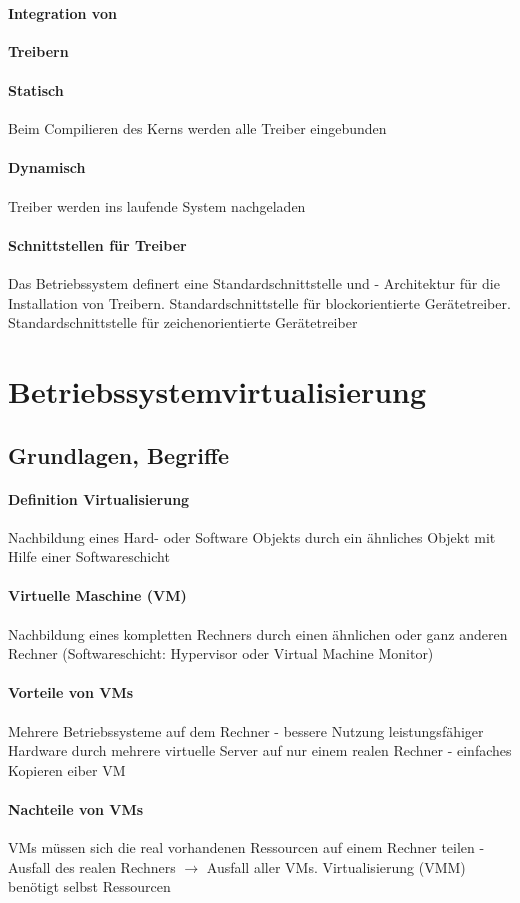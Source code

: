 \documentclass[10pt,a4paper,landscape]{article}
\begin{document}
\begin{multicols*}{3}
	\paragraph{Integration von} \textbf{Treibern}
	\paragraph{Statisch} Beim Compilieren des Kerns werden alle Treiber eingebunden
	\paragraph{Dynamisch} Treiber werden ins laufende System nachgeladen
	\paragraph{Schnittstellen für Treiber} Das Betriebssystem definert eine Standardschnittstelle und - Architektur für die Installation von Treibern. Standardschnittstelle für blockorientierte Gerätetreiber. Standardschnittstelle für zeichenorientierte Gerätetreiber
	\section{Betriebssystemvirtualisierung}
	\subsection{Grundlagen, Begriffe}
	\paragraph{Definition Virtualisierung} Nachbildung eines Hard- oder Software Objekts durch ein ähnliches Objekt mit Hilfe einer Softwareschicht
	\paragraph{Virtuelle Maschine (VM)} Nachbildung eines kompletten Rechners durch einen ähnlichen oder ganz anderen Rechner (Softwareschicht: Hypervisor oder Virtual Machine Monitor)
	\paragraph{Vorteile von VMs} Mehrere Betriebssysteme auf dem Rechner - bessere Nutzung leistungsfähiger Hardware durch mehrere virtuelle Server auf nur einem realen Rechner - einfaches Kopieren eiber VM
	\paragraph{Nachteile von VMs} VMs müssen sich die real vorhandenen Ressourcen auf einem Rechner teilen - Ausfall des realen Rechners $\rightarrow$ Ausfall aller VMs. Virtualisierung (VMM) benötigt selbst Ressourcen

\end{multicols*}
\end{document}
